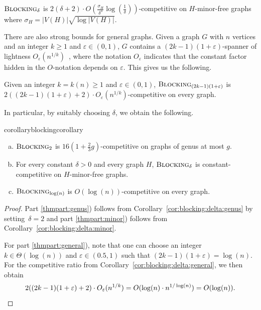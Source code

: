 \documentclass[a4paper,cleveref, autoref, thm-restate, thm-restate, UKenglish]{lipics-v2021}
\newcommand{\blocking}{\textsc{Blocking}}
\renewcommand{\epsilon}{\varepsilon}
\begin{document}
 
 \begin{corollary}\label{cor:blocking:delta:minor}
 $\blocking_\delta$ is $2(\delta + 2) \cdot O\left( \frac{\sigma_H}{\delta^3} \log \left( \frac{1}{\delta} \right) \right)$-competitive on $H$-minor-free graphs where $\sigma_H=|V(H)|\sqrt{\log |V(H)|}$.
 \end{corollary}
 

There are also strong bounds for general graphs.  Given a graph $G$ with $n$ vertices and an integer $k\geq 1$ and $\epsilon \in (0,1)$, $G$ contains a $(2k-1)(1+\epsilon)$-spanner of lightness $O_\epsilon\left(n^{1/k} \right)$~\cite{chechik}, where the notation $O_\epsilon$ indicates that the constant factor hidden in the $O$-notation depends on $\epsilon$. This gives us the following.

\begin{corollary}\label{cor:blocking:delta:general}
Given an integer $k=k(n)\geq 1$ and $\epsilon \in (0,1)$, $\blocking_{(2k-1)(1+\epsilon)}$ is ${2((2k-1)(1+\epsilon) + 2)} \cdot O_\epsilon\left(n^{1/k}  \right)$-competitive on every graph.
\end{corollary}

In particular, by suitably choosing $\delta$, we obtain the following.

\begin{restatable}{corollary}{blockingcorollary}\label{cor:blockinggenus}
\begin{enumerate}[a)]
\item $\blocking_2$ is $16(1+\frac{2}{3}g)$-competitive on graphs of genus at most $g$.\label{thmpart:genus}
\item For every constant $\delta>0$ and every graph $H$, $\blocking_\delta$ is constant-competitive on $H$-minor-free graphs.\label{thmpart:minor}
\item $\blocking_{\log (n)}$ is $O(\log (n))$-competitive on every graph.\label{thmpart:general}
\end{enumerate}
\end{restatable}

\begin{proof}
Part \ref{thmpart:genus}) follows from Corollary~\ref{cor:blocking:delta:genus} by setting~$\delta=2$
and part \ref{thmpart:minor}) follows from Corollary~\ref{cor:blocking:delta:minor}.

For part \ref{thmpart:general}), note that one can choose an integer $k\in \Theta(\log (n))$ and $\epsilon \in (0.5,1)$ such that $(2k-1)(1+\epsilon)=\log (n)$. For the competitive ratio from Corollary~\ref{cor:blocking:delta:general}, we then obtain
\begin{equation*}
2((2k-1)(1+\epsilon) + 2) \cdot O_\epsilon(n^{1/k})= O( \log (n) \cdot n^{1/\log (n)})=O(\log (n)).\qedhere
\end{equation*} 
\end{proof} 
\end{document}
